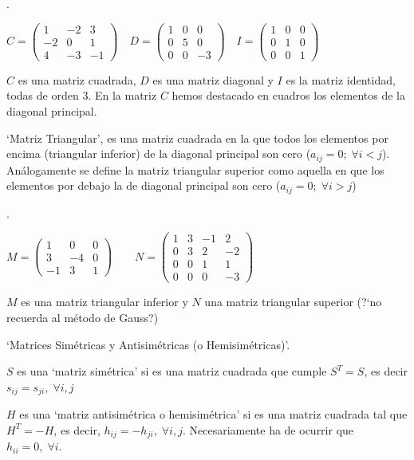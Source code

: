 \begin{ejem}.

 $C=\left(\begin{matrix} \boxed{1} & -2 & 3 \\-2 & \boxed{0} & 1 \\4 &-3 &\boxed{-1}  \end{matrix} \right) \quad D=\left(\begin{matrix} 1 & 0 &  0\\0 & 5 & 0 \\0 & 0 &-3  \end{matrix} \right) \quad I=\left(\begin{matrix} 1 & 0 & 0 \\0 & 1 & 0 \\0 &0 &1  \end{matrix} \right)$

\small{$C$ es una matriz cuadrada, $D$ es una matriz diagonal y $I$ es la matriz identidad, todas de orden $3$}.	 En la matriz $C$ hemos destacado en cuadros los elementos de la diagonal principal.
\end{ejem}
\begin{defi} `Matriz Triangular', es una matriz cuadrada en la que todos los elementos por encima (triangular inferior) de la diagonal principal son cero ($a_{ij}=0; \; \forall i < j$). Análogamente se define la matriz triangular superior como aquella en que los elementos por debajo la de diagonal principal son cero ($a_{ij}=0; \; \forall i > j$)	
\end{defi}
\begin{ejem}.

$M=\left( \begin{matrix} \boxed{1}&0&0\\3&\boxed{-4}&0 \\-1&3&\boxed{1}  \end{matrix}\right)\qquad N=\left( \begin{matrix} \boxed{1}&3&-1&2 \\0&\boxed{3}&2&-2\\0&0&\boxed{1}&1\\0&0&0&\boxed{-3}   \end{matrix}\right)$	

$M$ es una matriz triangular inferior y $N$ una matriz triangular superior (?`no recuerda al método de Gauss?)
\end{ejem}
\begin{defi} `Matrices Simétricas y Antisimétricas (o Hemisimétricas)'.

$S$ es una `matriz simétrica' si es una matriz cuadrada que cumple $S^T=S$, es decir $s_{ij}=s_{ji}, \; \forall i,j$

$H$ es una `matriz antisimétrica o hemisimétrica' si es una matriz cuadrada tal que $H^T=-H$, es decir, $h_{ij}=-h_{ji},\; \forall i,j$. Necesariamente ha de ocurrir que $h_{ii}=0,\; \forall i$.	
\end{defi}
